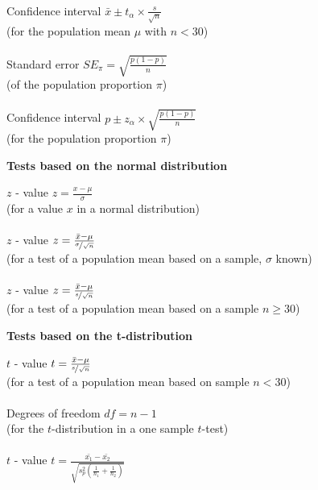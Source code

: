 \begin{minipage}[t]{.45\textwidth}
\\
Confidence interval \hfill $\bar{x} \pm t_\alpha \times \frac{s}{\sqrt{n}}$ \\
{\scriptsize (for the population mean $\mu$ with $n < 30$)}\\
\\
Standard error \hfill $SE_\pi = \sqrt{\frac{p(1 - p)}{n}}$ \\
{\scriptsize (of the population proportion $\pi$)}\\
\\
Confidence interval \hfill $p \pm z_\alpha \times \sqrt{\frac{p(1 - p)}{n}}$ \\
{\scriptsize (for the population proportion $\pi$)}\\
\end{minipage}
\hfill\vline\hfill
\begin{minipage}[t]{.45\textwidth}
\begin{center}
    \textbf{Tests based on the normal distribution}
\end{center}
\hline
\answerskip
$z$ - value \hfill $z = \frac{x - \mu}{\sigma}$\\
{\scriptsize (for a value $x$ in a normal distribution)} \\
\\
$z$ - value \hfill $z = \frac{\bar{x} - \mu}{\nicefrac{\sigma}{\sqrt{n}}}$\\
{\scriptsize (for a test of a population mean based on a sample, $\sigma$ known)} \\
\\
$z$ - value \hfill $z = \frac{\bar{x} - \mu}{\nicefrac{s}{\sqrt{n}}}$\\
{\scriptsize (for a test of a population mean based on a sample $n \geq 30$)} \\
\begin{center}
    \textbf{Tests based on the t-distribution}
\end{center}
\hline
\answerskip
$t$ - value \hfill $t = \frac{\bar{x} - \mu}{\nicefrac{s}{\sqrt{n}}}$\\
{\scriptsize (for a test of a population mean based on sample $n < 30$)} \\
\\
Degrees of freedom \hfill $df = n - 1$\\
{\scriptsize (for the $t$-distribution in a one sample $t$-test)} \\
\\
$t$ - value \hfill $t = \frac{\bar{x_1} - \bar{x_2}}
{\sqrt{s^2_p (\frac{1}{n_1} + \frac{1}{n_2})}}$\\

\end{minipage}
